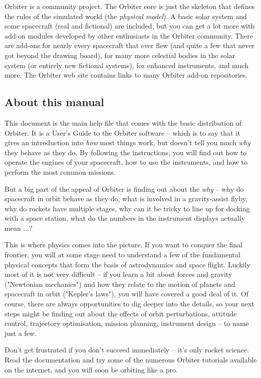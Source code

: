 \documentclass[Orbiter User Manual.tex]{subfiles}
\begin{document}
Orbiter is a community project. The Orbiter core is just the skeleton that
defines the rules of the simulated world (the \emph{physical model}). A basic
solar system and some spacecraft (real and fictional) are included, but you can
get a lot more with add-on modules developed by other enthusiasts in the Orbiter
community. There are add-ons for nearly every spacecraft that ever flew (and
quite a few that never got beyond the drawing board), for many more celestial
bodies in the solar system (or entirely new fictional systems), for enhanced
instruments, and much more. The Orbiter web site contains links to many Orbiter
add-on repositories.


\subsection{About this manual}

This document is the main help file that comes with the basic distribution of
Orbiter. It is a User's Guide to the Orbiter software -- which is to say that it
gives an introduction into \textit{how} most things work, but doesn't tell you
much \emph{why} they behave as they do. By following the instructions, you will
find out how to operate the engines of your spacecraft, how to use the
instruments, and how to perform the most common missions.

But a big part of the appeal of Orbiter is finding out about the \emph{why} --
why do spacecraft in orbit behave as they do, what is involved in a
gravity-assist flyby, why do rockets have multiple stages, why can it be tricky
to line up for docking with a space station, what do the numbers in the
instrument displays actually mean ...?

This is where physics comes into the picture. If you want to conquer the final
frontier, you will at some stage need to understand a few of the fundamental
physical concepts that form the basis of astrodynamics and space flight. Luckily
most of it is not very difficult -- if you learn a bit about forces and gravity
("Newtonian mechanics") and how they relate to the motion of planets and
spacecraft in orbit ("Kepler's laws"), you will have covered a good deal of it.
Of course, there are always opportunities to dig deeper into the details, so
your next steps might be finding out about the effects of orbit perturbations,
attitude control, trajectory optimisation, mission planning, instrument design
-- to name just a few.

Don't get frustrated if you don't succeed immediately -- it's only rocket
science. Read the documentation and try some of the numerous Orbiter tutorials
available on the internet, and you will soon be orbiting like a pro.
\end{document}
